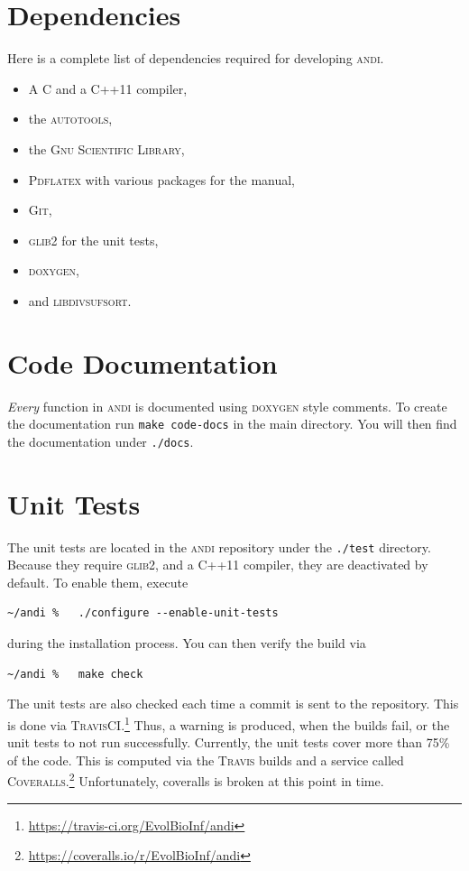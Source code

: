 \documentclass[a4paper,
  10pt,
  english,
  DIV=12,
  BCOR=8mm]{scrbook}
\newcommand{\algo}[1]{\textsc{{#1}}}
\newcommand{\andi}{\algo{andi}\xspace}
\begin{document}
\section{Dependencies}

Here is a complete list of dependencies required for developing \algo{andi}.

\begin{itemize}
  \item A C and a C++11 compiler,
  \item the \algo{autotools},
  \item the \algo{Gnu Scientific Library},
  \item \algo{Pdflatex} with various packages for the manual,
  \item \algo{Git},
  \item \algo{glib2} for the unit tests,
  \item \algo{doxygen},
  \item and \algo{libdivsufsort}.
\end{itemize}


\section{Code Documentation}

\emph{Every} function in \andi is documented using \algo{doxygen} style comments. To create the documentation run \lstinline$make code-docs$ in the main directory. You will then find the documentation under \lstinline$./docs$.


\section{Unit Tests}

The unit tests are located in the \andi repository under the \lstinline$./test$ directory. Because they require \algo{glib2}, and a C++11 compiler, they are deactivated by default. To enable them, execute

\begin{lstlisting}
~/andi %   ./configure --enable-unit-tests
\end{lstlisting}

\noindent during the installation process. You can then verify the build via 

\begin{lstlisting}
~/andi %   make check
\end{lstlisting}

\noindent The unit tests are also checked each time a commit is sent to the repository. This is done via \algo{TravisCI}.\footnote{\url{https://travis-ci.org/EvolBioInf/andi}} Thus, a warning is produced, when the builds fail, or the unit tests to not run successfully. Currently, the unit tests cover more than 75\% of the code. This is computed via the \algo{Travis} builds and a service called \algo{Coveralls}.\footnote{\url{https://coveralls.io/r/EvolBioInf/andi}} Unfortunately, coveralls is broken at this point in time.
\end{document}
